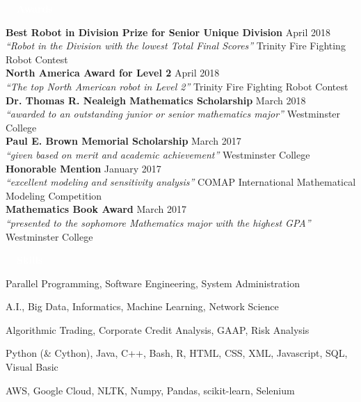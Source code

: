 \documentclass[letterpaper,11pt]{article}
\newcommand{\resheading}[1]{{\vspace{2pt}\large \colorbox{electricpurple}{\begin{minipage}{\textwidth}{\textbf{#1 \vphantom{p\^{E}}}}\end{minipage}}}\vspace{8pt}}
\newcommand{\Award}[4]{
	\textbf{#1} \hfill #2 \\
	\textit{``#3''} \hfill #4 \\

}
\begin{document}
	\pagebreak
	
		\resheading{\textcolor{white}{\ \faAward \ Awards}}


			\Award{Best Robot in Division Prize for Senior Unique Division}{April 2018}{Robot in the Division with the lowest Total Final Scores}{Trinity Fire Fighting Robot Contest}

			\Award{North America Award for Level 2}{April 2018}{The top North American robot in Level 2}{Trinity Fire Fighting Robot Contest}

			\Award{Dr. Thomas R. Nealeigh Mathematics Scholarship}{March 2018}{awarded to an outstanding junior or senior mathematics major}{Westminster College}

			\Award{Paul E. Brown Memorial Scholarship}{March 2017}{given based on merit and academic achievement}{Westminster College}

			\Award{Honorable Mention}{January 2017}{excellent modeling and sensitivity analysis}{COMAP International Mathematical Modeling Competition}

			\Award{Mathematics Book Award}{March 2017}{presented to the sophomore Mathematics major with the highest GPA}{Westminster College}
	
	\resheading{\textcolor{white}{\ \faCheckSquare \ Skills}}
	\vspace{-16pt}
	\begin{description}[itemsep=1pt]
		\item[\faServer \ Computer Science:]  Parallel Programming,  Software Engineering, System Administration
		\item[\faChartLine \ Data Science:] A.I., Big Data, Informatics, Machine Learning, Network Science
		\item[\faDollarSign \ Finance and Economics:] Algorithmic Trading, Corporate Credit Analysis, GAAP, Risk Analysis
		\item[\faCode \ Languages:] Python (\& Cython), Java, C++, Bash, R, HTML, CSS, XML, Javascript, SQL, Visual Basic
		\item[\faFileCode \ Software \& Tools:] AWS, Google Cloud, NLTK, Numpy, Pandas, scikit-learn, Selenium
	\end{description}
	
\end{document}
